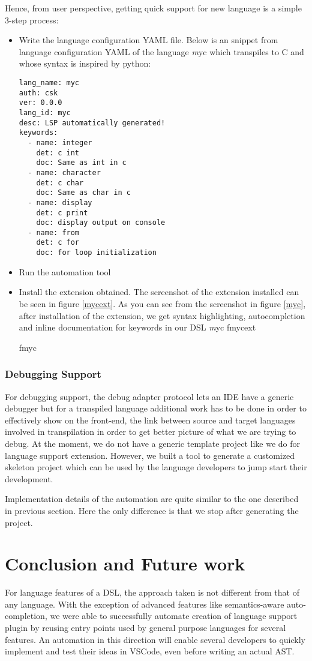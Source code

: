 \documentclass[dvipsnames]{article}
\newcommand{\loadFig}[1]{{%
  \expandafter\let\csname if#1\endcsname\iftrue%
  }
}%
\begin{document}
Hence, from user perspective, getting quick support for new language is a simple 3-step process:
\begin{itemize}
\item Write the language configuration YAML file. Below is an snippet from language configuration YAML of the language {\textit myc} which transpiles to C and whose syntax is inspired by python:
\begin{verbatim}
lang_name: myc
auth: csk
ver: 0.0.0
lang_id: myc
desc: LSP automatically generated!
keywords:
  - name: integer
    det: c int
    doc: Same as int in c
  - name: character
    det: c char
    doc: Same as char in c
  - name: display
    det: c print
    doc: display output on console
  - name: from
    det: c for
    doc: for loop initialization
\end{verbatim}
\item Run the automation tool
\item Install the extension obtained. The screenshot of the extension installed can be seen in figure \ref{mycext}. As you can see from the screenshot in figure \ref{myc}, after installation of the extension, we get syntax highlighting, autocompletion and inline documentation for keywords in our DSL {\textit myc}
\loadFig{mycext}
\loadFig{myc}
\end{itemize}

\subsubsection{Debugging Support}
For debugging support, the debug adapter protocol lets an IDE have a generic debugger but for a transpiled language additional work has to be done in order to effectively show on the front-end, the link between source and target languages involved in transpilation in order to get better picture of what we are trying to debug.
At the moment, we do not have a generic template project like we do for language support extension.
However, we built a tool to generate a customized skeleton project which can be used by the language developers to jump start their development.

Implementation details of the automation are quite similar to the one described in previous section.
Here the only difference is that we stop after generating the project.

\section{Conclusion and Future work}
For language features of a DSL, the approach taken is not different from that of any language.
With the exception of advanced features like semantics-aware auto-completion, we were able to successfully automate creation of language support plugin by reusing entry points used by general purpose languages for several features.
An automation in this direction will enable several developers to quickly implement and test their ideas in VSCode, even before writing an actual AST.
\end{document}
